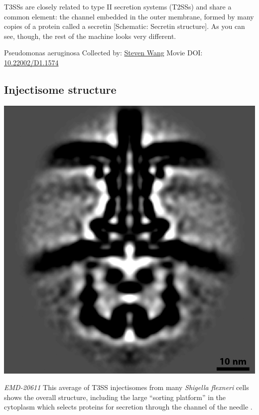 \documentclass[]{tufte-book}
\begin{document}
T3SSs are closely related to type II secretion systems (T2SSs) and share a common element: the channel embedded in the outer membrane, formed by many copies of a protein called a secretin {[}Schematic: Secretin structure{]}. As you can see, though, the rest of the machine looks very different.



\hypertarget{htmlwidget-d2e5c66954b5fb718cdc}{}

\label{fig:9-4}Pseudomonas aeruginosa Collected by: \protect\hyperlink{steven_wang}{Steven Wang} Movie DOI: \href{https://doi.org/10.22002/D1.1574}{10.22002/D1.1574}

\hypertarget{Injectisome_structure}{%
\subsection{Injectisome structure}\label{Injectisome_structure}}

\includegraphics{img/schematics/9_4_1}

\emph{EMD-20611}
This average of T3SS injectisomes from many \emph{Shigella flexneri} cells shows the overall structure, including the large ``sorting platform'' in the cytoplasm which selects proteins for secretion through the channel of the needle \citep{tachiyama2019}.
\end{document}
